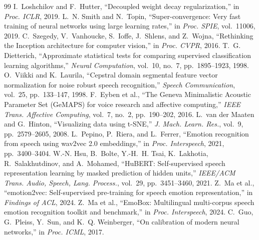 \begin{thebibliography}{99}
 I.~Loshchilov and F.~Hutter, ``Decoupled weight decay regularization,'' in \emph{Proc. ICLR}, 2019.
 L.~N. Smith and N.~Topin, ``Super-convergence: Very fast training of neural networks using large learning rates,'' in \emph{Proc. SPIE}, vol.~11006, 2019.
 C.~Szegedy, V.~Vanhoucke, S.~Ioffe, J.~Shlens, and Z.~Wojna, ``Rethinking the Inception architecture for computer vision,'' in \emph{Proc. CVPR}, 2016.
 T.~G. Dietterich, ``Approximate statistical tests for comparing supervised classification learning algorithms,'' \emph{Neural Computation}, vol.~10, no.~7, pp.~1895--1923, 1998.
 O.~Viikki and K.~Laurila, ``Cepstral domain segmental feature vector normalization for noise robust speech recognition,'' \emph{Speech Communication}, vol.~25, pp.~133--147, 1998.
 F.~Eyben et al., ``The Geneva Minimalistic Acoustic Parameter Set (GeMAPS) for voice research and affective computing,'' \emph{IEEE Trans. Affective Computing}, vol.~7, no.~2, pp.~190--202, 2016.
 L.~van der Maaten and G.~Hinton, ``Visualizing data using t-SNE,'' \emph{J. Mach. Learn. Res.}, vol.~9, pp.~2579--2605, 2008.
 L.~Pepino, P.~Riera, and L.~Ferrer, ``Emotion recognition from speech using wav2vec 2.0 embeddings,'' in \emph{Proc. Interspeech}, 2021, pp.~3400--3404.
 W.-N. Hsu, B.~Bolte, Y.-H.~H. Tsai, K.~Lakhotia, R.~Salakhutdinov, and A.~Mohamed, ``HuBERT: Self-supervised speech representation learning by masked prediction of hidden units,'' \emph{IEEE/ACM Trans. Audio, Speech, Lang. Process.}, vol.~29, pp.~3451--3460, 2021.
 Z.~Ma et al., ``emotion2vec: Self-supervised pre-training for speech emotion representation,'' in \emph{Findings of ACL}, 2024.
 Z.~Ma et al., ``EmoBox: Multilingual multi-corpus speech emotion recognition toolkit and benchmark,'' in \emph{Proc. Interspeech}, 2024.
 C.~Guo, G.~Pleiss, Y.~Sun, and K.~Q. Weinberger, ``On calibration of modern neural networks,'' in \emph{Proc. ICML}, 2017.
\end{thebibliography}
